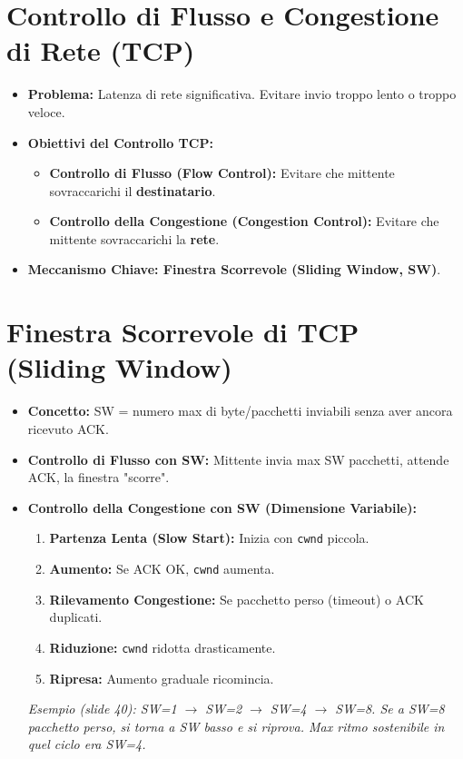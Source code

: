 \section{Controllo di Flusso e Congestione di Rete (TCP)}
\begin{itemize}
    \item \textbf{Problema:} Latenza di rete significativa. Evitare invio troppo lento o troppo veloce.
    \item \textbf{Obiettivi del Controllo TCP:}
    \begin{itemize}
        \item \textbf{Controllo di Flusso (Flow Control):} Evitare che mittente sovraccarichi il \textbf{destinatario}.
        \item \textbf{Controllo della Congestione (Congestion Control):} Evitare che mittente sovraccarichi la \textbf{rete}.
    \end{itemize}
    \item \textbf{Meccanismo Chiave: Finestra Scorrevole (Sliding Window, SW)}.
\end{itemize}

\section{Finestra Scorrevole di TCP (Sliding Window)}
\begin{itemize}
    \item \textbf{Concetto:} SW = numero max di byte/pacchetti inviabili senza aver ancora ricevuto ACK.
    \item \textbf{Controllo di Flusso con SW:} Mittente invia max SW pacchetti, attende ACK, la finestra "scorre".
    \item \textbf{Controllo della Congestione con SW (Dimensione Variabile):}
    \begin{enumerate}
        \item \textbf{Partenza Lenta (Slow Start):} Inizia con \texttt{cwnd} piccola.
        \item \textbf{Aumento:} Se ACK OK, \texttt{cwnd} aumenta.
        \item \textbf{Rilevamento Congestione:} Se pacchetto perso (timeout) o ACK duplicati.
        \item \textbf{Riduzione:} \texttt{cwnd} ridotta drasticamente.
        \item \textbf{Ripresa:} Aumento graduale ricomincia.
    \end{enumerate}
    \textit{Esempio (slide 40): SW=1 $\rightarrow$ SW=2 $\rightarrow$ SW=4 $\rightarrow$ SW=8. Se a SW=8 pacchetto perso, si torna a SW basso e si riprova. Max ritmo sostenibile in quel ciclo era SW=4.}
\end{itemize}

